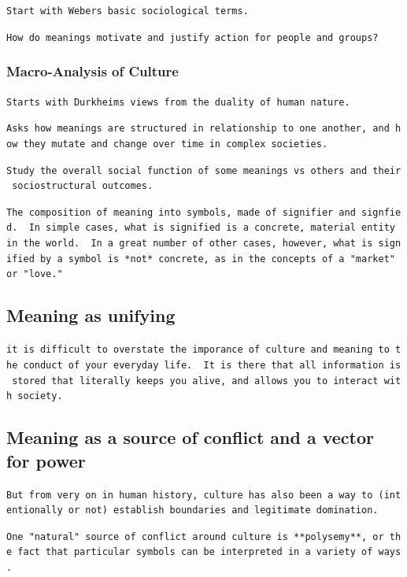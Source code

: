 \documentclass[
  letterpaper,
  DIV=11,
  numbers=noendperiod,
  oneside]{scrartcl}
\begin{document}
\texttt{Start\ with\ Weber\textquotesingle{}s\ basic\ sociological\ terms.}

\texttt{How\ do\ meanings\ motivate\ and\ justify\ action\ for\ people\ and\ groups?}

\subsubsection{Macro-Analysis of
Culture}\label{macro-analysis-of-culture}

\texttt{Starts\ with\ Durkheim\textquotesingle{}s\ views\ from\ the\ duality\ of\ human\ nature.}

\texttt{Asks\ how\ meanings\ are\ structured\ in\ relationship\ to\ one\ another,\ and\ how\ they\ mutate\ and\ change\ over\ time\ in\ complex\ societies.}

\texttt{Study\ the\ overall\ social\ function\ of\ some\ meanings\ vs\ others\ and\ their\ sociostructural\ outcomes.}

\texttt{The\ composition\ of\ meaning\ into\ symbols,\ made\ of\ signifier\ and\ signfied.\ \ In\ simple\ cases,\ what\ is\ signified\ is\ a\ concrete,\ material\ entity\ in\ the\ world.\ \ In\ a\ great\ number\ of\ other\ cases,\ however,\ what\ is\ signified\ by\ a\ symbol\ is\ *not*\ concrete,\ as\ in\ the\ concepts\ of\ a\ "market"\ or\ "love."}

\subsection{Meaning as unifying}\label{meaning-as-unifying}

\texttt{it\ is\ difficult\ to\ overstate\ the\ imporance\ of\ culture\ and\ meaning\ to\ the\ conduct\ of\ your\ everyday\ life.\ \ It\ is\ there\ that\ all\ information\ is\ stored\ that\ literally\ keeps\ you\ alive,\ and\ allows\ you\ to\ interact\ with\ society.}

\subsection{Meaning as a source of conflict and a vector for
power}\label{meaning-as-a-source-of-conflict-and-a-vector-for-power}

\texttt{But\ from\ very\ on\ in\ human\ history,\ culture\ has\ also\ been\ a\ way\ to\ (intentionally\ or\ not)\ establish\ boundaries\ and\ legitimate\ domination.}

\texttt{One\ "natural"\ source\ of\ conflict\ around\ culture\ is\ **polysemy**,\ or\ the\ fact\ that\ particular\ symbols\ can\ be\ interpreted\ in\ a\ variety\ of\ ways.}
\end{document}
